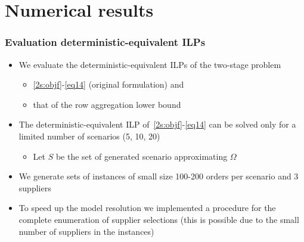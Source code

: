 \documentclass[,9pt,xcolor={dvipsnames}]{beamer} %
\begin{document}
\section {Numerical results}
\begin{frame}%
	\frametitle{Evaluation deterministic-equivalent ILPs}
	\begin{itemize}
		\item<1-> We evaluate the deterministic-equivalent ILPs of the two-stage problem
		\begin{itemize}
			\item<1-> \eqref{2s:objf}-\eqref{eq14} (original formulation) and
			\item<2-> that of the row aggregation lower bound
		\end{itemize}
		\bigskip
		\item<3-> The deterministic-equivalent ILP of~\eqref{2s:objf}-\eqref{eq14} can be solved only for a limited number of scenarios (5, 10, 20)
		\begin{itemize}
			\item<4-> Let $ S$ be the set of generated scenario approximating $\Omega$
		\end{itemize}
		\bigskip
		\item<5-> We generate sets of instances of small size 100-200 orders per scenario and 3 suppliers
		\bigskip
		\item<6-> To speed up the model resolution we implemented a procedure for the complete enumeration of supplier selections (this is possible due to the small number of suppliers in the instances)
	\end{itemize}
\end{frame}
\end{document}
